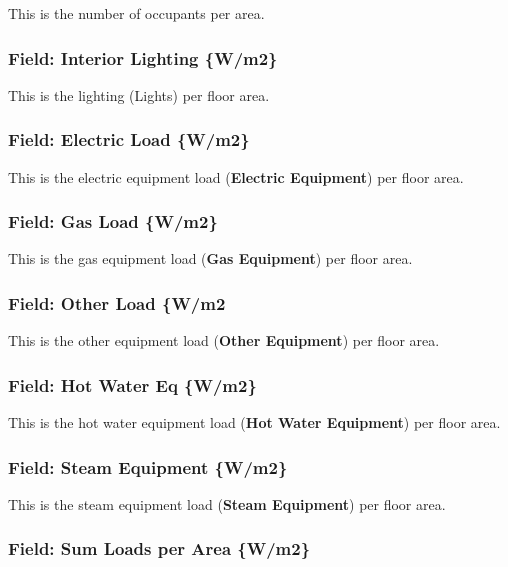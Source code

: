 This is the number of occupants per area.

\subsubsection{Field: Interior Lighting \{W/m2\}}\label{field-interior-lighting-wm2}

This is the lighting (Lights) per floor area.

\subsubsection{Field: Electric Load \{W/m2\}}\label{field-electric-load-wm2}

This is the electric equipment load (\textbf{Electric Equipment}) per floor area.

\subsubsection{Field: Gas Load \{W/m2\}}\label{field-gas-load-wm2}

This is the gas equipment load (\textbf{Gas Equipment}) per floor area.

\subsubsection{Field: Other Load \{W/m2}\label{field-other-load-wm2}

This is the other equipment load (\textbf{Other Equipment}) per floor area.

\subsubsection{Field: Hot Water Eq \{W/m2\}}\label{field-hot-water-eq-wm2}

This is the hot water equipment load (\textbf{Hot Water Equipment}) per floor area.

\subsubsection{Field: Steam Equipment \{W/m2\}}\label{field-steam-equipment-wm2}

This is the steam equipment load (\textbf{Steam Equipment}) per floor area.

\subsubsection{Field: Sum Loads per Area \{W/m2\}}\label{field-sum-loads-per-area-wm2}

